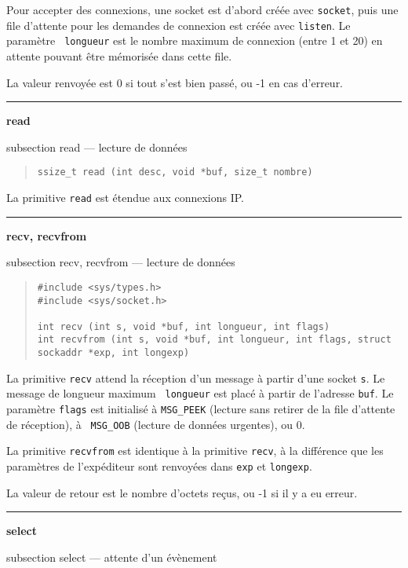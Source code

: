 \documentclass [twoside] {report}
\newcommand {\primitive} [1]
    {
	{\large \bf #1}
	\addcontentsline {toc} {subsection} {#1}
    }
\newcommand {\separation}
    {
	\vspace {7mm}
	\nopagebreak
	\hrule
    }
\begin{document}
Pour accepter des connexions, une socket est d'abord créée
avec {\tt socket}, puis une file d'attente pour les demandes
de connexion est créée avec {\tt listen}. Le paramètre {\tt
longueur} est le nombre maximum de connexion (entre 1 et 20)
en attente pouvant être mémorisée dans cette file.

La valeur renvoyée est 0 si tout s'est bien passé, ou -1 en
cas d'erreur.



\separation
\primitive {read} --- lecture de données

\begin {quote}
\begin {verbatim}
ssize_t read (int desc, void *buf, size_t nombre)
\end{verbatim}
\end {quote}

La primitive {\tt read} est étendue aux connexions IP.



\separation
\primitive {recv, recvfrom} --- lecture de données

\begin {quote}
\begin {verbatim}
#include <sys/types.h>
#include <sys/socket.h>

int recv (int s, void *buf, int longueur, int flags)
int recvfrom (int s, void *buf, int longueur, int flags, struct sockaddr *exp, int longexp)
\end{verbatim}
\end {quote}

La primitive {\tt recv} attend la réception
d'un message à partir d'une
socket {\tt s}. Le message de longueur maximum {\tt
longueur} est placé à partir de l'adresse {\tt buf}.
Le paramètre {\tt flags} est initialisé à {\tt MSG\_PEEK}
(lecture sans retirer de la file d'attente de réception), à {\tt
MSG\_OOB} (lecture de données urgentes), ou 0.

La primitive {\tt recvfrom} est identique à la primitive
{\tt recv}, à la différence que les paramètres de
l'expéditeur sont renvoyées dans {\tt exp} et {\tt longexp}.

La valeur de retour est le nombre d'octets reçus, ou -1 si
il y a eu erreur.



\separation
\primitive {select} --- attente d'un évènement
\end{document}
